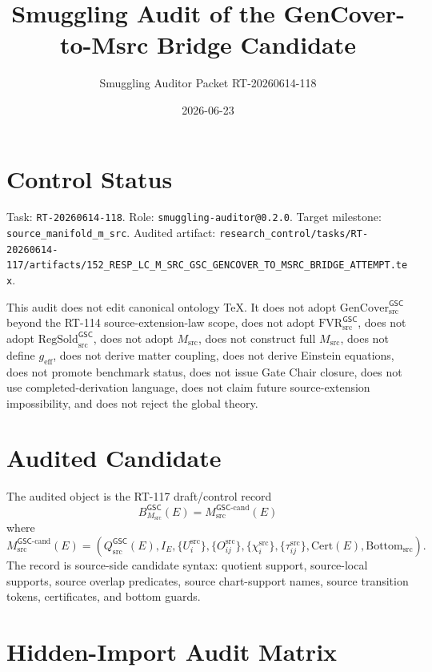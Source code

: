 \documentclass[11pt]{article}
\title{Smuggling Audit of the GenCover-to-Msrc Bridge Candidate}
\author{Smuggling Auditor Packet RT-20260614-118}
\date{2026-06-23}
\newcommand{\GSC}{\mathsf{GSC}}
\newcommand{\Msrc}{M_{\mathrm{src}}}
\newcommand{\Qsrc}{Q_{\mathrm{src}}}
\newcommand{\Bottomsrc}{\mathrm{Bottom}_{\mathrm{src}}}
\newcommand{\GenCover}{\mathrm{GenCover}_{\mathrm{src}}^{\GSC}}
\begin{document}
\maketitle

\section{Control Status}

Task: \texttt{RT-20260614-118}. Role:
\texttt{smuggling-auditor@0.2.0}. Target milestone:
\texttt{source\_manifold\_m\_src}. Audited artifact:
\texttt{research\_control/tasks/RT-20260614-117/artifacts/152\_RESP\_LC\_M\_SRC\_GSC\_GENCOVER\_TO\_MSRC\_BRIDGE\_ATTEMPT.tex}.

This audit does not edit canonical ontology TeX. It does not adopt
\(\GenCover\) beyond the RT-114 source-extension-law scope, does not adopt
\(\mathrm{FVR}_{\mathrm{src}}^{\GSC}\), does not adopt
\(\mathrm{RegSold}_{\mathrm{src}}^{\GSC}\), does not adopt \(\Msrc\), does
not construct full \(\Msrc\), does not define \(g_{\mathrm{eff}}\), does not
derive matter coupling, does not derive Einstein equations, does not promote
benchmark status, does not issue Gate Chair closure, does not use
completed-derivation language, does not claim future source-extension
impossibility, and does not reject the global theory.

\section{Audited Candidate}

The audited object is the RT-117 draft/control record
\[
  B_{\Msrc}^{\GSC}(E)=\Msrc^{\GSC\mbox{-}\mathrm{cand}}(E)
\]
where
\[
  \Msrc^{\GSC\mbox{-}\mathrm{cand}}(E)=
  \left(
  \Qsrc^{\GSC}(E),
  I_E,
  \{U_i^{\mathrm{src}}\},
  \{O_{ij}^{\mathrm{src}}\},
  \{\chi_i^{\mathrm{src}}\},
  \{\tau_{ij}^{\mathrm{src}}\},
  \mathrm{Cert}(E),
  \Bottomsrc
  \right).
\]
The record is source-side candidate syntax: quotient support, source-local
supports, source overlap predicates, source chart-support names, source
transition tokens, certificates, and bottom guards.

\section{Hidden-Import Audit Matrix}
\end{document}
